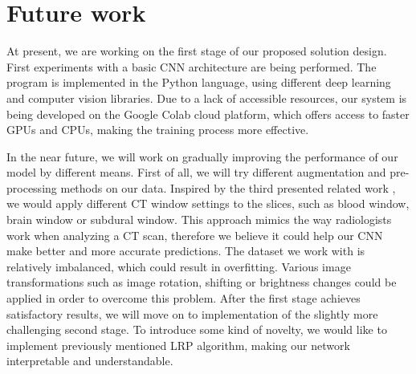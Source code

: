 \section{Future work}
At present, we are working on the first stage of our proposed solution design. First experiments with a basic CNN architecture are being performed. The program is implemented in the Python language, using different deep learning and computer vision libraries. Due to a lack of accessible resources, our system is being developed on the Google Colab cloud platform, which offers access to faster GPUs and CPUs, making the training process more effective.


In the near future, we will work on gradually improving the performance of our model by different means. First of all, we will try different augmentation and pre-processing methods on our data. Inspired by the third presented related work \cite{relatedWork3}, we would apply different CT window settings to the slices, such as blood window, brain window or subdural window. This approach mimics the way radiologists work when analyzing a CT scan, therefore we believe it could help our CNN make better and more accurate predictions. The dataset we work with is relatively imbalanced, which could result in overfitting. Various image transformations such as image rotation, shifting or brightness changes could be applied in order to overcome this problem. After the first stage achieves satisfactory results, we will move on to implementation of the slightly more challenging second stage. To introduce some kind of novelty, we would like to implement previously mentioned LRP algorithm, making our network interpretable and understandable.
